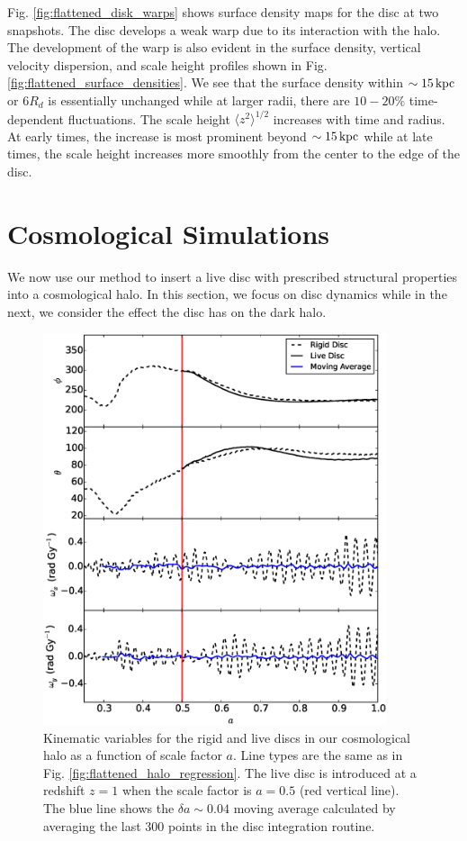 Fig. \ref{fig:flattened_disk_warps} shows surface density maps for the
disc at two snapshots.  The disc develops a weak warp due to its
interaction with the halo.  The development of the warp is also
evident in the surface density, vertical velocity dispersion, and
scale height profiles shown in
Fig. \ref{fig:flattened_surface_densities}.  We see that the surface
density within $\sim 15\,{\rm kpc}$ or $6R_d$ is essentially unchanged
while at larger radii, there are $10-20\%$ time-dependent
fluctuations.  The scale height $\langle z^2\rangle^{1/2}$ increases
with time and radius.  At early times, the increase is most prominent
beyond $\sim 15\,{\rm kpc}$ while at late times, the scale height
increases more smoothly from the center to the edge of the disc.

\section{Cosmological Simulations}

We now use our method to insert a live disc with prescribed structural 
properties into a cosmological halo.  In this section, we focus on 
disc dynamics while in the next, we consider the effect the disc has 
on the dark halo. 

\begin{figure}
\centering
\includegraphics[width=0.9\textwidth]{../figures/cosmo_halo_regressions.eps}
\caption{Kinematic variables for the rigid and live discs in our
  cosmological halo as a function of scale factor $a$.  Line types are
  the same as in Fig. \ref{fig:flattened_halo_regression}.  The live
  disc is introduced at a redshift $z=1$ when the scale factor is
  $a=0.5$ (red vertical line). The blue line shows the $\delta a \sim
  0.04$ moving average calculated by averaging the last 300 points in
  the disc integration routine.} \label{fig:cosmo_inclination}
\end{figure}

